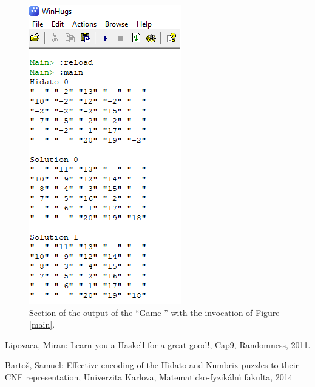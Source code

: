 \documentclass{llncs}
\begin{document}
\begin{figure}
\begin{center}
\includegraphics[width= .5\columnwidth]{figuras/corrida}
\end{center}
\caption{Section of the output of the ``Game '' with the invocation of Figure \ref{main}.}
\label{corrida}
\end{figure}
\begin{thebibliography}{5}  
    Lipovaca, Miran: 
    Learn you a Haskell for a great good!,
    Cap9, Randomness,
    2011.
    
	Barto{\v{s}}, Samuel:
	Effective encoding of the Hidato and Numbrix puzzles to their CNF representation,
	Univerzita Karlova, Matematicko-fyzik{\'a}ln{\'\i} fakulta,
	2014
\end{thebibliography}
\end{document}
